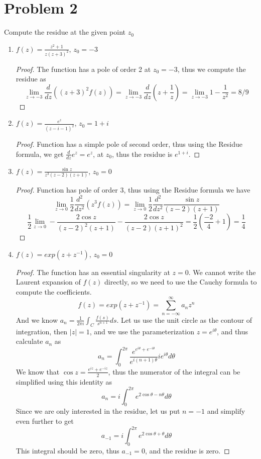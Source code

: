 \documentclass{article}[12pt]
\begin{document}
\section*{Problem 2}Compute the residue at the given point $z_0$
\begin{enumerate}
\item{}$f(z)=\frac{z^2+1}{z(z+3)^2}$, $z_0=-3$
\begin{proof}
The function has a pole of order 2 at $z_0=-3$, thus we compute the
residue as
\[
\lim_{z\to -3} \frac{d}{dz}\left( (z+3)^2 f(z)\right)=
\lim_{z\to -3} \frac{d}{dz}\left(z+\frac{1}{z}\right)=
\lim_{z\to -3}  1 - \frac{1}{z^2} = 8/9
\]
\end{proof}

\item{}$f(z)=\frac{e^z}{(z-i-1)^2}$, $z_0=1+i$
\begin{proof}
Function has a simple pole of second order, thus using the
Residue formula, we get $\frac{d}{dz}e^z=e^z$, at $z_0$, thus
the residue is $e^{1+i}$.
\end{proof}


\item{}$f(z)=\frac{\sin z}{z^3(z-2)(z+1)}$, $z_0=0$
\begin{proof}
Function has pole of order 3, thus using the Residue formula
we have
\[
\lim_{z\to 0} \frac{1}{2} \frac{d^2}{dz^2} \left( z^3 f(z)\right) =
\lim_{z\to 0} \frac{1}{2} \frac{d^2}{dz^2} \frac{\sin z}{(z-2)(z+1)}
\]
\[
\frac{1}{2}\lim_{z\to 0} -\frac{2\cos z}{(z-2)^2(z+1)} - \frac{2\cos z}{(z-2)(z+1)^2}=\frac{1}{2}(\frac{-2}{4}+1)=\frac{1}{4}
\]
\end{proof}


\item{}$f(z)=exp(z+z^{-1})$, $z_0=0$
\begin{proof}
The function has an essential singularity at $z=0$.
We cannot write the Laurent expansion of $f(z)$ directly, so
we need to use the Cauchy formula to compute the coefficients.
\[
f(z) = exp(z+z^{-1}) = \sum_{n=-\infty}^\infty a_nz^n
\]
And we know $a_n=\frac{1}{2\pi i}\int_C \frac{f(s)}{s^{n+1}}ds$.
Let us use the unit circle as the contour of integration, then
$|z|=1$, and we use the parameterization $z=e^{i\theta}$, and thus
calculate $a_n$ as
\[
a_n = \int_0^{2\pi} \frac{e^{e^{i\theta}+e^{-i\theta}}}{e^{i(n+1)\theta}}ie^{i\theta}d\theta
\]
We know that $\cos z = \frac{e^{iz}+e^{-iz}}{2}$, thus the numerator
of the integral can be simplified using this identity as
\[
a_n = i \int_0^{2\pi} e^{2\cos \theta-n\theta}d\theta
\]
Since we are only interested in the residue, let us put $n=-1$
and simplify even further to get
\[
a_{-1} = i\int_0^{2\pi} e^{2\cos \theta + \theta}d\theta
\]
This integral should be zero, thus $a_{-1}=0$, and the residue is zero.
\end{proof}

\end{enumerate}
\end{document}
